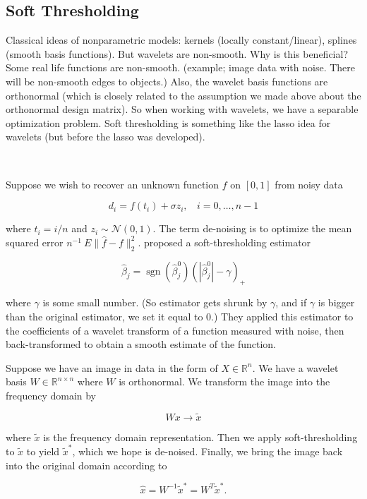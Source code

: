 \subsection{Soft Thresholding}

Classical ideas of nonparametric models: kernels (locally constant/linear), splines (smooth basis functions). But wavelets are non-smooth. Why is this beneficial? Some real life functions are non-smooth. (example; image data with noise. There will be non-smooth edges to objects.) Also, the wavelet basis functions are orthonormal (which is closely related to the assumption we made above about the orthonormal design matrix). So when working with wavelets, we have a separable optimization problem. Soft thresholding is something like the lasso idea for wavelets (but before the lasso was developed).


\

Suppose we wish to recover an unknown function \(f\) on \([0,1]\) from noisy data

\[
d_i = f(t_i) + \sigma z_i, \ \ \ \ i=0, \ldots, n-1
\]

where \(t_i = i/n\) and \(z_i \sim \mathcal{N}(0,1)\). The term de-noising is to optimize the mean squared error \(n^{-1}\ E \lVert \hat{f} - f \rVert_2^2\). \citet{Donoho1994} proposed a soft-thresholding estimator

\[
\hat{\beta}_j = \operatorname{sgn}(\hat{\beta}_j^0) (| \hat{\beta}_j^0| - \gamma)_+
\]

where \(\gamma\) is some small number. (So estimator gets shrunk by \(\gamma\), and if \(\gamma\) is bigger than the original estimator, we set it equal to 0.) They applied this estimator to the coefficients of a wavelet transform of a function measured with noise, then back-transformed to obtain a smooth estimate of the function.

\begin{example} Suppose we have an image in data in the form of \(X \in \mathbb{R}^n\). We have a wavelet basis \(W \in \mathbb{R}^{n \times n}\) where \(W\) is orthonormal. We transform the image into the frequency domain by

\[
W x \to \tilde{x}
\]

where \(\tilde{x}\) is the frequency domain representation. Then we apply soft-thresholding to \(\tilde{x}\) to yield \(\tilde{x}^*\), which we hope is de-noised. Finally, we bring the image back into the original domain according to

\[
\hat{x} = W^{-1}\tilde{x}^* = W^T \tilde{x}^*.
\]

\end{example}

